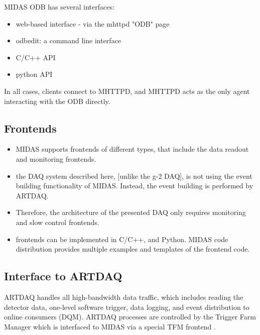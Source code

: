 MIDAS ODB has several interfaces:
\begin{itemize}
\item 
  web-based interface - via the mhttpd "ODB" page
\item
  odbedit: a command line interface
\item
  C/C++ API
\item
  python API
\end{itemize}

In all cases, clients connect to MHTTPD, and MHTTPD acts as the only agent
interacting with the ODB directly.

\subsection{Frontends}

\begin{itemize}
\item 
  MIDAS supports frontends of different types, that include the data readout and monitoring
  frontends.
\item 
  the DAQ system described here, [unlike the g-2 DAQ], is not using the event building
  functionality of MIDAS. Instead, the event building is performed by ARTDAQ.
\item 
  Therefore, the architecture of the presented DAQ only requires monitoring
  and slow control frontends.
\item
  frontends can be implemented in C/C++, and Python. MIDAS code distribution
  provides multiple examples and templates of the frontend code.
\end{itemize}


\subsection{Interface to ARTDAQ}
ARTDAQ handles all high-bandwidth data traffic, which includes reading the
detector data, one-level software trigger, data logging, and event distribution
to online consumers (DQM).
%
ARTDAQ processes are controlled by the Trigger Farm Manager \cite{DAQ_2025_TFM}
which is interfaced to MIDAS via a special TFM frontend \cite{DAQ_2025_FRONTENDS}.

